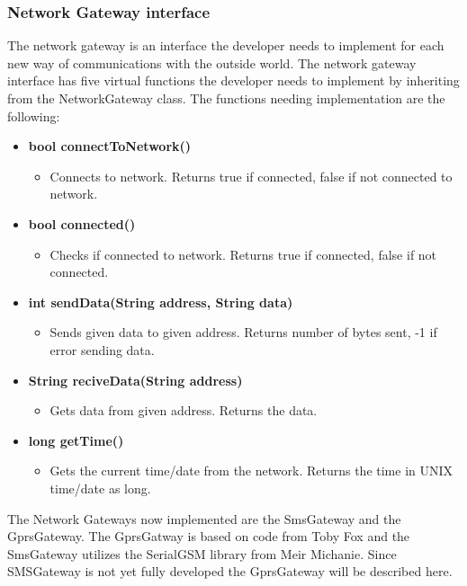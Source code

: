 \subsubsection{Network Gateway interface}
The network gateway is an interface the developer needs to implement for each new way 
of communications with the outside world. The network gateway interface has five virtual 
functions the developer needs to implement by inheriting from the NetworkGateway class.
The functions needing implementation are the following:
\begin{itemize}
    \item \textbf{bool connectToNetwork()}
        \begin{itemize}
            \item Connects to network. Returns true if connected, false if not
                  connected to network.
        \end{itemize}
    \item \textbf{bool connected()}
        \begin{itemize}
            \item Checks if connected to network. Returns true if connected, false
                  if not connected.
        \end{itemize}
    \item \textbf{int sendData(String address, String data)}
        \begin{itemize}
            \item Sends given data to given address. Returns number of bytes sent, -1 if 
                  error sending data.
        \end{itemize}
    \item \textbf{String reciveData(String address)}
        \begin{itemize}
            \item Gets data from given address. Returns the data.
        \end{itemize}
     \item \textbf{long getTime()}
        \begin{itemize}
            \item Gets the current time/date from the network. Returns the time in UNIX time/date as long.
        \end{itemize}
\end{itemize}
The Network Gateways now implemented are the SmsGateway and the GprsGateway. The 
GprsGatway is based on code from Toby Fox\cite{tobek} and the SmsGateway utilizes the
SerialGSM library from Meir Michanie\cite{meirm}. Since SMSGateway is not yet fully
developed the GprsGateway will be described here.

